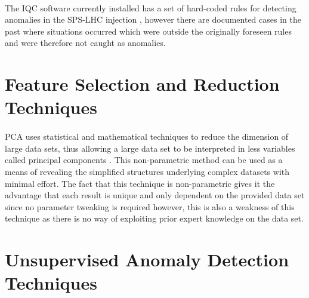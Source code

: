 \paragraph{ }The \ac{IQC} software currently installed has a set of hard-coded rules for detecting anomalies in the \acs{SPS}-\acs{LHC} injection \cite{Drosdal2011}, however there are documented cases in the past where situations occurred which were outside the originally foreseen rules and were therefore not caught as anomalies.

\section{Feature Selection and Reduction Techniques}


\paragraph{ } \acs{PCA} uses statistical and mathematical techniques to reduce the dimension of large data sets, thus allowing a large data set to be interpreted in less variables called principal components \cite{Richardson2009}. This non-parametric method can be used as a means of revealing the simplified structures underlying complex datasets with minimal effort. The fact that this technique is non-parametric gives it the advantage that each result is unique and only dependent on the provided data set since no parameter tweaking is required \cite{Shlens2014} however, this is also a weakness of this technique as there is no way of exploiting prior expert knowledge on the data set.




\section{Unsupervised Anomaly Detection Techniques}